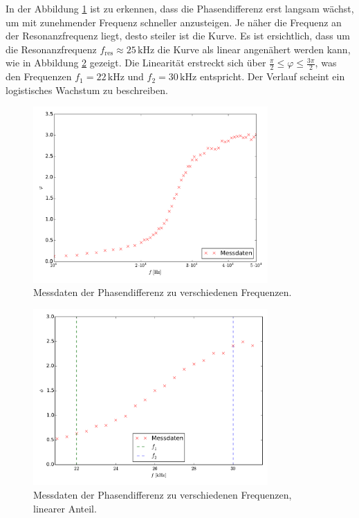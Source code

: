 In der Abbildung \ref{fig:phase} ist zu erkennen, dass die Phasendifferenz erst langsam wächst, um mit zunehmender Frequenz schneller anzusteigen. 
Je näher die Frequenz an der Resonanzfrequenz liegt, desto steiler ist die Kurve. 
Es ist ersichtlich, dass um die Resonanzfrequenz  $f_\mathup{res}\approx25\,\si{\kilo\hertz}$ die Kurve als linear angenähert werden kann, wie in Abbildung \ref{fig:phase_lin} gezeigt. 
Die Linearität erstreckt sich über $\frac{\pi}{2}\leq\varphi\leq\frac{3\pi}{2}$, was den Frequenzen $f_1=22\,\si{\kilo\hertz}$ und $f_2=30\,\si{\kilo\hertz}$ entspricht.
Der Verlauf scheint ein logistisches Wachstum zu beschreiben.
\begin{figure}[h]
		\centering
		\includegraphics[width=0.8\textwidth]{build/plot_phase.pdf}
		\caption{Messdaten der Phasendifferenz zu verschiedenen Frequenzen. \cite{matplotlib}}
\label{fig:phase}
\end{figure}
\begin{figure}[h]
		\centering
		\includegraphics[width=0.8\textwidth]{build/plot_phase_linear.pdf}
		\caption{Messdaten der Phasendifferenz zu verschiedenen Frequenzen, linearer Anteil. \cite{matplotlib}}
\label{fig:phase_lin}
\end{figure}
